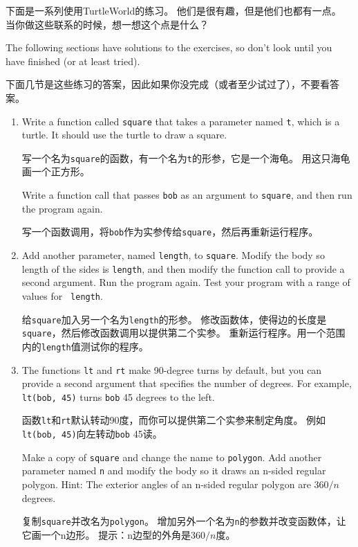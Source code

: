 \documentclass[10pt]{book}
\begin{document}
\begin{CJK}{UTF8}{gbsn}
下面是一系列使用TurtleWorld的练习。
他们是很有趣，但是他们也都有一点。
当你做这些联系的时候，想一想这个点是什么？

The following sections have solutions to the exercises, so
don't look until you have finished (or at least tried).

下面几节是这些练习的答案，因此如果你没完成（或者至少试过了），不要看答案。

\begin{enumerate}

\item Write a function called {\tt square} that takes a parameter
named {\tt t}, which is a turtle.  It should use the turtle to draw
a square.

写一个名为{\tt square}的函数，有一个名为{\tt t}的形参，它是一个海龟。
用这只海龟画一个正方形。

Write a function call that passes {\tt bob} as an argument to
{\tt square}, and then run the program again.

写一个函数调用，将{\tt bob}作为实参传给{\tt square}，然后再重新运行程序。

\item Add another parameter, named {\tt length}, to {\tt square}.
Modify the body so length of the sides is {\tt length}, and then
modify the function call to provide a second argument.  Run the
program again.  Test your program with a range of values for {\tt
length}.

给{\tt square}加入另一个名为{\tt length}的形参。
修改函数体，使得边的长度是{\tt square}，然后修改函数调用以提供第二个实参。
重新运行程序。用一个范围内的{\tt length}值测试你的程序。

\item The functions {\tt lt} and {\tt rt} make 90-degree turns by
default, but you can provide a second argument that specifies the
number of degrees.  For example, {\tt lt(bob, 45)} turns {\tt bob} 45
degrees to the left.

函数{\tt lt}和{\tt rt}默认转动90度，而你可以提供第二个实参来制定角度。
例如{\tt lt(bob, 45)}向左转动{\tt bob} 45读。

Make a copy of {\tt square} and change the name to {\tt polygon}.  Add
another parameter named {\tt n} and modify the body so it draws an
n-sided regular polygon.  Hint: The exterior angles of an n-sided regular
polygon are $360/n$ degrees.

复制{\tt square}并改名为{\tt polygon}。
增加另外一个名为{\tt n}的参数并改变函数体，让它画一个n边形。
提示：n边型的外角是$360/n$度。


\end{enumerate}
\end{CJK}
\end{document}
